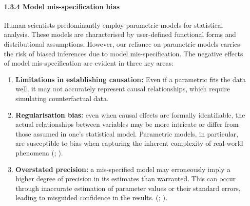 \documentclass[
  singlecolumn]{article}
\let\oldparagraph\paragraph
\renewcommand{\paragraph}[1]{\oldparagraph{#1}\mbox{}}
\begin{document}
\paragraph{1.3.4 Model mis-specification
bias}\label{model-mis-specification-bias}

Human scientists predominantly employ parametric models for statistical
analysis. These models are characterised by user-defined functional
forms and distributional assumptions. However, our reliance on
parametric models carries the risk of biased inferences due to model
mis-specification. The negative effects of model mis-specification are
evident in three key areas:

\begin{enumerate}
\def\labelenumi{\arabic{enumi}.}
\item
  \textbf{Limitations in establishing causation:} Even if a parametric
  fits the data well, it may not accurately represent causal
  relationships, which require simulating counterfactual data.
\item
  \textbf{Regularisation bias:} even when causal effects are formally
  identifiable, the actual relationships between variables may be more
  intricate or differ from those assumed in one's statistical model.
  Parametric models, in particular, are susceptible to bias when
  capturing the inherent complexity of real-world phenomena
  (;
  ).
\item
  \textbf{Overstated precision:} a mis-specified model may erroneously
  imply a higher degree of precision in its estimates than warranted.
  This can occur through inaccurate estimation of parameter values or
  their standard errors, leading to misguided confidence in the results.
  (;
  ).
\end{enumerate}
\end{document}
